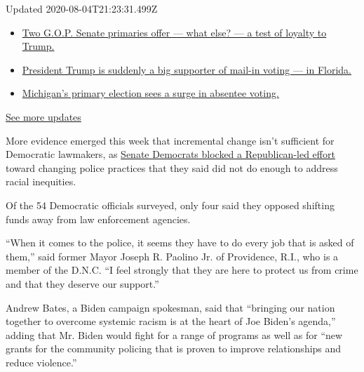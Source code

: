 Updated 2020-08-04T21:23:31.499Z

\begin{itemize}
\tightlist
\item
  \href{https://www.nytimes3xbfgragh.onion/2020/08/04/us/elections/primary-election-michigan-arizona-kansas.html?action=click\&pgtype=Article\&state=default\&region=MAIN_CONTENT_1\&context=storylines_live_updates\#link-3924dd44}{Two
  G.O.P. Senate primaries offer --- what else? --- a test of loyalty to
  Trump.}
\item
  \href{https://www.nytimes3xbfgragh.onion/2020/08/04/us/elections/primary-election-michigan-arizona-kansas.html?action=click\&pgtype=Article\&state=default\&region=MAIN_CONTENT_1\&context=storylines_live_updates\#link-32b39e33}{President
  Trump is suddenly a big supporter of mail-in voting --- in Florida.}
\item
  \href{https://www.nytimes3xbfgragh.onion/2020/08/04/us/elections/primary-election-michigan-arizona-kansas.html?action=click\&pgtype=Article\&state=default\&region=MAIN_CONTENT_1\&context=storylines_live_updates\#link-ab1004d}{Michigan's
  primary election sees a surge in absentee voting.}
\end{itemize}

\href{https://www.nytimes3xbfgragh.onion/2020/08/04/us/elections/primary-election-michigan-arizona-kansas.html?action=click\&pgtype=Article\&state=default\&region=MAIN_CONTENT_1\&context=storylines_live_updates}{See
more updates}

More evidence emerged this week that incremental change isn't sufficient
for Democratic lawmakers, as
\href{https://www.nytimes3xbfgragh.onion/2020/06/24/us/politics/senate-police-bill.html}{Senate
Democrats blocked a Republican-led effort} toward changing police
practices that they said did not do enough to address racial inequities.

Of the 54 Democratic officials surveyed, only four said they opposed
shifting funds away from law enforcement agencies.

``When it comes to the police, it seems they have to do every job that
is asked of them,'' said former Mayor Joseph R. Paolino Jr. of
Providence, R.I., who is a member of the D.N.C. ``I feel strongly that
they are here to protect us from crime and that they deserve our
support.''

Andrew Bates, a Biden campaign spokesman, said that ``bringing our
nation together to overcome systemic racism is at the heart of Joe
Biden's agenda,'' adding that Mr. Biden would fight for a range of
programs as well as for ``new grants for the community policing that is
proven to improve relationships and reduce violence.''


